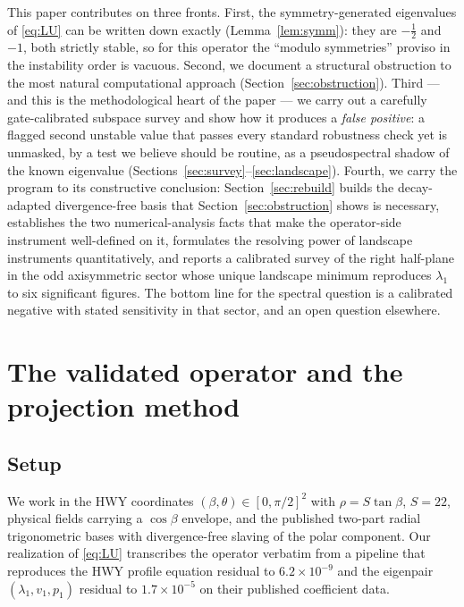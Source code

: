 \documentclass[11pt]{article}
\theoremstyle{plain}
\theoremstyle{remark}
\begin{document}
This paper contributes on three fronts. First, the symmetry-generated
eigenvalues of \eqref{eq:LU} can be written down exactly
(Lemma~\ref{lem:symm}): they are $-\tfrac12$ and $-1$, both strictly
stable, so for this operator the ``modulo symmetries'' proviso in the
instability order is vacuous. Second, we document a structural
obstruction to the most natural computational approach
(Section~\ref{sec:obstruction}). Third --- and this is the
methodological heart of the paper --- we carry out a carefully
gate-calibrated subspace survey and show how it produces a
\emph{false positive}: a flagged second unstable value that passes
every standard robustness check yet is unmasked, by a test we believe
should be routine, as a pseudospectral shadow of the known eigenvalue
(Sections~\ref{sec:survey}--\ref{sec:landscape}). Fourth, we carry the
program to its constructive conclusion: Section~\ref{sec:rebuild}
builds the decay-adapted divergence-free basis that
Section~\ref{sec:obstruction} shows is necessary, establishes the two
numerical-analysis facts that make the operator-side instrument
well-defined on it, formulates the resolving power of landscape
instruments quantitatively, and reports a calibrated survey of the
right half-plane in the odd axisymmetric sector whose unique landscape
minimum reproduces $\lambda_1$ to six significant figures. The bottom
line for the spectral question is a calibrated negative with stated
sensitivity in that sector, and an open question elsewhere.

\section{The validated operator and the projection method}\label{sec:method}
\subsection{Setup}
We work in the HWY coordinates $(\beta,\theta)\in[0,\pi/2]^2$ with
$\rho = S\tan\beta$, $S=22$, physical fields carrying a $\cos\beta$
envelope, and the published two-part radial trigonometric bases with
divergence-free slaving of the polar component. Our realization of
\eqref{eq:LU} transcribes the operator verbatim from a pipeline that
reproduces the HWY profile equation residual to $6.2\times 10^{-9}$ and
the eigenpair $(\lambda_1, v_1, p_1)$ residual to $1.7\times 10^{-5}$ on
their published coefficient data.
\end{document}
